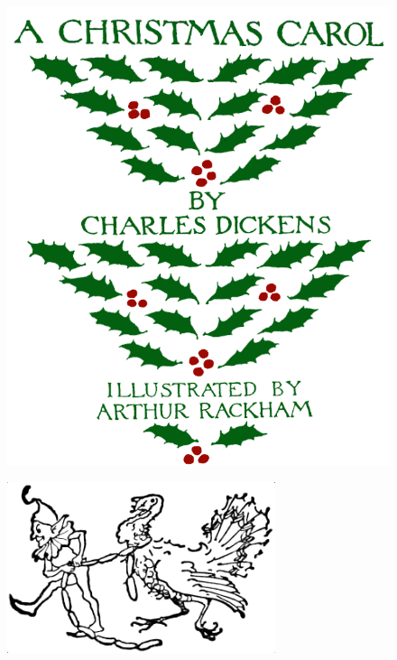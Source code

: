 \documentclass[paper=5.5in:8.5in,BCOR=7mm,twoside,DIV=calc,12pt,usegeometry]{scrbook} %
\begin{document}
\renewcommand*{\sectionmarkformat}{}

\renewcommand*\raggedchapter{\centering}
\pagestyle{empty}
\begin{figure}[p]
\begin{minipage}[c]{\linewidth}
\includegraphics[width=\linewidth]{newaccfront}
\end{minipage}
\end{figure}


\renewcommand*{\chapterpagestyle}{empty}

\tableofcontents
\begin{figure}
\centering
\includegraphics[width=0.7\textwidth]{elfturkey}
\end{figure}
\clearpage
\end{document}
